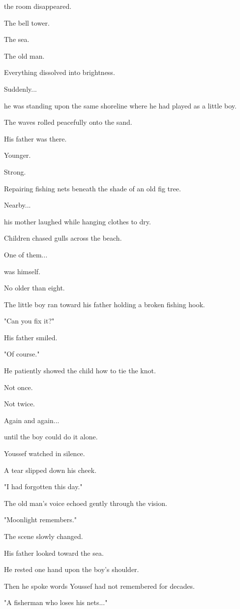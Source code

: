 \documentclass[12pt,openany]{book}
\begin{document}
the room disappeared.

The bell tower.

The sea.

The old man.

Everything dissolved into brightness.

Suddenly...

he was standing upon the same shoreline where he had played as a little boy.

The waves rolled peacefully onto the sand.

His father was there.

Younger.

Strong.

Repairing fishing nets beneath the shade of an old fig tree.

Nearby...

his mother laughed while hanging clothes to dry.

Children chased gulls across the beach.

One of them...

was himself.

No older than eight.

The little boy ran toward his father holding a broken fishing hook.

"Can you fix it?"

His father smiled.

"Of course."

He patiently showed the child how to tie the knot.

Not once.

Not twice.

Again and again...

until the boy could do it alone.

Youssef watched in silence.

A tear slipped down his cheek.

"I had forgotten this day."

The old man's voice echoed gently through the vision.

"Moonlight remembers."

The scene slowly changed.

His father looked toward the sea.

He rested one hand upon the boy's shoulder.

Then he spoke words Youssef had not remembered for decades.

"A fisherman who loses his nets..."
\end{document}
